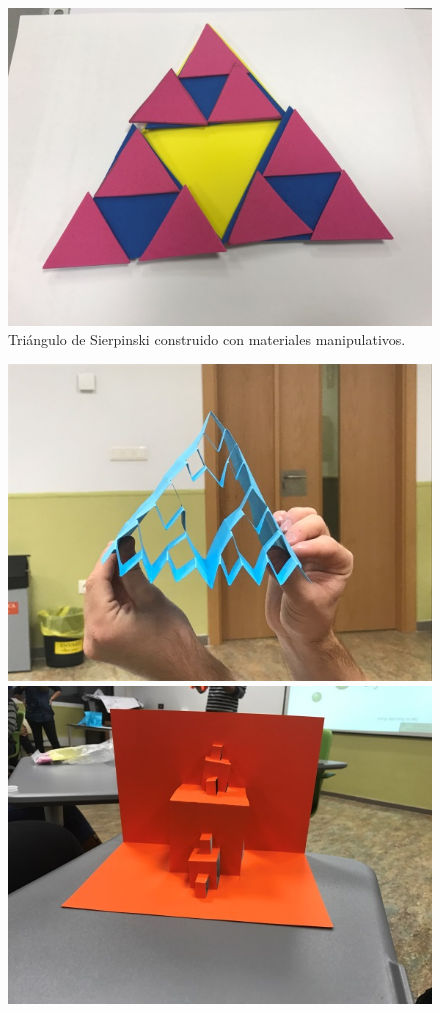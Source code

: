 \begin{figure}[h]
\centering
\includegraphics{img/grupo6_2.jpg}
\caption{Triángulo de Sierpinski construido con materiales manipulativos.}
\end{figure}

\begin{figure}[h]
\centering
\includegraphics{img/grupo6_3.jpg}
\includegraphics{img/grupo6_4.jpg}
\end{figure}



